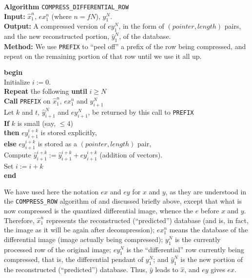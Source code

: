 \documentclass[11pt,a4paper]{article}
\newcommand{\xh}{\hat{x}}
\newcommand{\yh}{\hat{y}}
\begin{document}
{\bf Algorithm} {\tt COMPRESS\_DIFFERENTIAL\_ROW}\\
{\bf Input:} $\xh_1^n$, $ex_1^n$ (where $n=fN$), $y_1^N$.\\
{\bf Output:} A compressed version of $ey_1^N$, in the form of
$(pointer,length)$ pairs, and the new reconstructed portion,
$\yh_1^N$, of the database.\\
{\bf Method:} We use {\tt PREFIX} to ``peel off'' a prefix
of the row being compressed, and repeat on the remaining
portion of that row until we use it all up.
\begin{tabbing}
{\bf begin}\=  \\
        \> Initialize $i := 0$.\\
        \> {\bf Repeat} \= the following {\bf until} $i \geq N$ \\
        \> \> {\bf Call} {\tt PREFIX} on $\xh_1^n$, $ex_1^n$ and $y_{i+1}^N$ \\
        \> \> Let $k$ and $t$, $\yh_{i+1}^N$ and $ey_{i+1}^N$, be returned by this call to {\tt PREFIX} \\
        \> \> {\bf If} $k$ is small (say, $\leq 4$) \\
        \> \> {\bf then} $ey_{i+1}^{i+k}$ is stored explicitly,\\
        \> \> {\bf else} $ey_{i+1}^{i+k}$ is stored as a $(pointer,length)$ pair,\\
        \> \> Compute $\yh_{i+1}^{i+k} := \yh_{i+1}^{i+k} +
        ey_{i+1}^{i+k}$ (addition of vectors).\\
        \> \> Set $i := i+k$\\
{\bf end}
\end{tabbing}

We have used here the notation $ex$ and $ey$ for $x$ and $y$, as they
are understood in the {\tt COMPRESS\_ROW} algorithm of \cite{ags} and
discussed briefly above, except that what
is now compressed is the quantized differential image, whence the $e$
before $x$ and $y$. Therefore, $\xh_1^n$ represents the reconstructed
(``predicted'') database (and is, in fact, the image as it will be
again after decompression); $ex_1^n$ means the database of the
differential image (image actually being compressed); $y_1^N$ is the
currently processed row of the original image; $ey_1^N$ is the
``differential'' row currently being compressed, that is, the
differential pendant of $y_1^N$; and $\yh_1^N$ is the new portion of
the reconstructed (``predicted'') database. Thus, $\yh$ leads to
$\xh$, and $ey$ gives $ex$.
\end{document}
